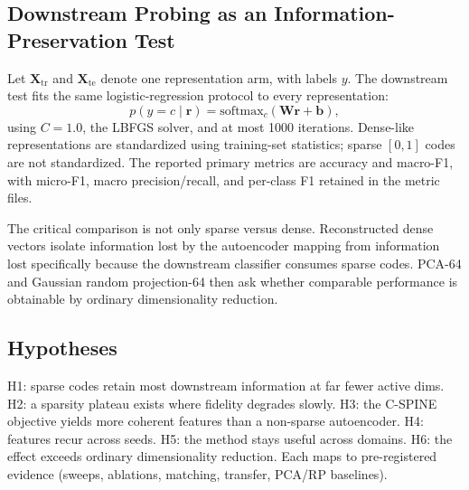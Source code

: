\documentclass[conference]{IEEEtran}
\begin{document}
\subsection{Downstream Probing as an Information-Preservation Test}
Let $\mathbf{X}_{\mathrm{tr}}$ and $\mathbf{X}_{\mathrm{te}}$ denote one
representation arm, with labels $y$. The downstream test fits the same
logistic-regression protocol to every representation:
\begin{equation}
p(y=c\mid\mathbf{r}) = \mathrm{softmax}_c(\mathbf{W}\mathbf{r}+\mathbf{b}),
\label{eq:softmax}
\end{equation}
using $C=1.0$, the LBFGS solver, and at most 1000 iterations. Dense-like
representations are standardized using training-set statistics; sparse
$[0,1]$ codes are not standardized. The reported primary metrics are
accuracy and macro-F1, with micro-F1, macro precision/recall, and per-class
F1 retained in the metric files.

The critical comparison is not only sparse versus dense. Reconstructed
dense vectors isolate information lost by the autoencoder mapping from
information lost specifically because the downstream classifier consumes
sparse codes. PCA-64 and Gaussian random projection-64 then ask whether
comparable performance is obtainable by ordinary dimensionality reduction.

\subsection{Hypotheses}
H1: sparse codes retain most downstream information at far fewer active
dims. H2: a sparsity plateau exists where fidelity degrades slowly.
H3: the C-SPINE objective yields more coherent features than a non-sparse
autoencoder. H4: features recur across seeds. H5: the method stays useful
across domains. H6: the effect exceeds ordinary dimensionality reduction.
Each maps to pre-registered evidence (sweeps, ablations, matching,
transfer, PCA/RP baselines).
\end{document}
